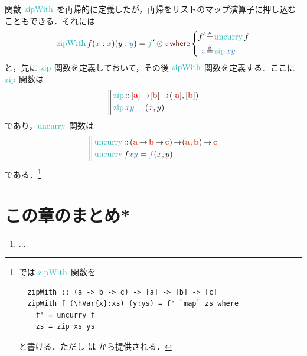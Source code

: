 \documentclass[a5paper,twoside,fleqn,draft]{jsbook}
\begin{document}
関数 $\mZipWith$ を再帰的に定義したが，再帰をリストのマップ演算子に押し込むこともできる．それには
\begin{equation}
  \mZipWith f(\hVar{x}:\hListVarWith{x})(y:\hListVarWith{y})
  =\hFunc{f}'\mMapList\hListVarWith{z}
  \mWhere
  \left\{
  \begin{aligned}
    f'
    &\mLetEq\hUncurry f\\
    \hListVarWith{z}
    &\mLetEq\mZipFunc\hListVarWith{x}\hListVarWith{y}
  \end{aligned}
  \right.
\end{equation}
と，先に $\mZipFunc$ 関数を定義しておいて，その後 $\mZipWith$ 関数を定義する．ここに $\mZipFunc$ 関数は
\begin{equation}
  \left\mBrace
  \begin{aligned}
    {}&\mZipFunc\hIsTypeOf{}\mProjEXP{\hListConstruct{\hTypeName{a}}}
    {\mProjEXP{[\mB]}
      {(\hListConstruct{\hTypeName{a}},[\mB])}}\\
    {}&\mZipFunc \hVar{x}\hVar{y}=(x,y)
  \end{aligned}
  \right.
\end{equation}
であり，$\hUncurry$ 関数は
\begin{equation}
  \left\mBrace
  \begin{aligned}
    {}&\hUncurry\hIsTypeOf{}
    \mProjEXP{(\mProjEXP{\mA }{\mProjEXP{\mB }{\mC }})}
          {\mProjEXP{(\mA ,\mB )}{\mC }}\\
          {}&\hUncurry f\hVar{x}\hVar{y}=\hFunc{f}(x,y)
  \end{aligned}
  \right.
\end{equation}
である．\footnote{\haskell では $\mZipWith$ 関数を
\begin{verbatim}
  zipWith :: (a -> b -> c) -> [a] -> [b] -> [c]
  zipWith f (\hVar{x}:xs) (y:ys) = f' `map` zs where
    f' = uncurry f
    zs = zip xs ys
\end{verbatim}
と書ける．ただし  は  から提供される．}


\section{この章のまとめ*}

\begin{enumerate}
\item ...
\end{enumerate}
\end{document}
